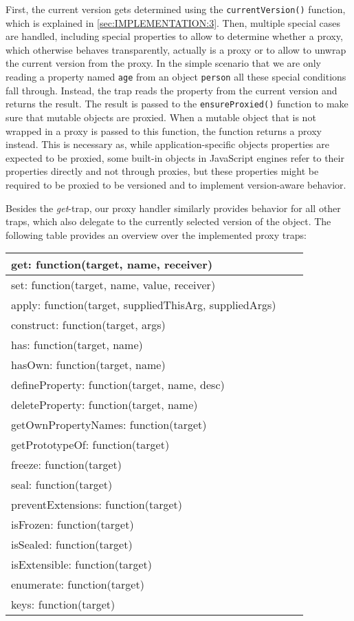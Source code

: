 First, the current version gets determined using the \lstinline{currentVersion()} function, which is explained in \ref{sec:IMPLEMENTATION:3}.
Then, multiple special cases are handled, including special properties to allow to determine whether a proxy, which otherwise behaves transparently, actually is a proxy or to allow to unwrap the current version from the proxy.
In the simple scenario that we are only reading a property named \lstinline{age} from an object \lstinline{person} all these special conditions fall through.
Instead, the trap reads the property from the current version and returns the result.
The result is passed to the \lstinline{ensureProxied()} function to make sure that mutable objects are proxied.
When a mutable object that is not wrapped in a proxy is passed to this function, the function returns a proxy instead.
This is necessary as, while application-specific objects properties are expected to be proxied, some built-in objects in JavaScript engines refer to their properties directly and not through proxies, but these properties might be required to be proxied to be versioned and to implement version-aware behavior.

Besides the \emph{get}-trap, our proxy handler similarly provides behavior for all other traps, which also delegate to the currently selected version of the object.
The following table  provides an overview over the implemented proxy traps:

\begin{table}[h]
\begin{tabular}{|l|l|r|}
\hline
get: function(target, name, receiver) \\ \hline
set: function(target, name, value, receiver) \\ \hline
apply: function(target, suppliedThisArg, suppliedArgs) \\ \hline
construct: function(target, args) \\ \hline
has: function(target, name) \\ \hline
hasOwn: function(target, name) \\ \hline
defineProperty: function(target, name, desc) \\ \hline
deleteProperty: function(target, name) \\ \hline
getOwnPropertyNames: function(target) \\ \hline
getPrototypeOf: function(target) \\ \hline
freeze: function(target) \\ \hline
seal: function(target) \\ \hline
preventExtensions: function(target) \\ \hline
isFrozen: function(target) \\ \hline
isSealed: function(target) \\ \hline
isExtensible: function(target) \\ \hline
enumerate: function(target) \\ \hline
keys: function(target) \\ \hline
\end{tabular}
\end{table}

